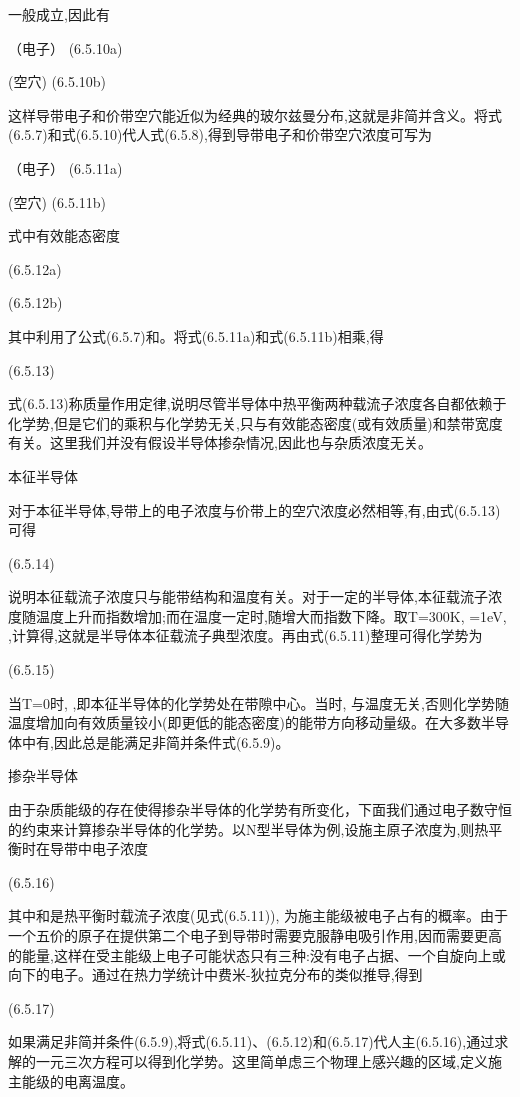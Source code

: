 一般成立,因此有

 （电子）	(6.5.10a)

 (空穴) 	(6.5.10b)

这样导带电子和价带空穴能近似为经典的玻尔兹曼分布,这就是非简并含义。将式(6.5.7)和式(6.5.10)代人式(6.5.8),得到导带电子和价带空穴浓度可写为

 （电子）	(6.5.11a)

 (空穴)	 (6.5.11b)

式中有效能态密度

 	(6.5.12a)

 	(6.5.12b)

其中利用了公式(6.5.7)和。将式(6.5.11a)和式(6.5.11b)相乘,得

 	(6.5.13)

式(6.5.13)称质量作用定律,说明尽管半导体中热平衡两种载流子浓度各自都依赖于化学势,但是它们的乘积与化学势无关,只与有效能态密度(或有效质量)和禁带宽度有关。这里我们并没有假设半导体掺杂情况,因此也与杂质浓度无关。

本征半导体

对于本征半导体,导带上的电子浓度与价带上的空穴浓度必然相等,有,由式(6.5.13)可得

 	(6.5.14)

说明本征载流子浓度只与能带结构和温度有关。对于一定的半导体,本征载流子浓度随温度上升而指数增加;而在温度一定时,随增大而指数下降。取T=300K, =1eV, ,计算得,这就是半导体本征载流子典型浓度。再由式(6.5.11)整理可得化学势为

	 (6.5.15)

当T=0时, ,即本征半导体的化学势处在带隙中心。当时, 与温度无关,否则化学势随温度增加向有效质量铰小(即更低的能态密度)的能带方向移动量级。在大多数半导体中有,因此总是能满足非简并条件式(6.5.9)。

掺杂半导体

由于杂质能级的存在使得掺杂半导体的化学势有所变化，下面我们通过电子数守恒的约束来计算掺杂半导体的化学势。以N型半导体为例,设施主原子浓度为,则热平衡时在导带中电子浓度

 	(6.5.16)

其中和是热平衡时载流子浓度(见式(6.5.11)), 为施主能级被电子占有的概率。由于一个五价的原子在提供第二个电子到导带时需要克服静电吸引作用,因而需要更高的能量,这样在受主能级上电子可能状态只有三种:没有电子占据、一个自旋向上或向下的电子。通过在热力学统计中费米-狄拉克分布的类似推导,得到

	 (6.5.17)

如果满足非简并条件(6.5.9),将式(6.5.11)、(6.5.12)和(6.5.17)代人主(6.5.16),通过求解的一元三次方程可以得到化学势。这里简单虑三个物理上感兴趣的区域,定义施主能级的电离温度。

